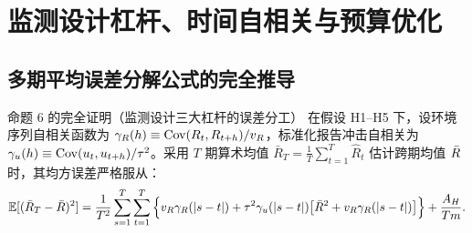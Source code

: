 \section{监测设计杠杆、时间自相关与预算优化}
\label{sec:part09}

\subsection{多期平均误差分解公式的完全推导}

\begin{theorembox}{命题 6 的完全证明（监测设计三大杠杆的误差分工）}
在假设 H1--H5 下，设环境序列自相关函数为 $\gamma_R(h) \equiv \mathrm{Cov}(R_t, R_{t+h})/v_R$，标准化报告冲击自相关为 $\gamma_u(h) \equiv \mathrm{Cov}(u_t, u_{t+h})/\tau^2$。采用 $T$ 期算术均值 $\bar{R}_T = \frac{1}{T}\sum_{t=1}^T \widehat{R}_t$ 估计跨期均值 $\bar{R}$ 时，其均方误差严格服从：
\begin{equation}
  \mathbb{E}[(\bar{R}_T - \bar{R})^2] = \frac{1}{T^2}\sum_{s=1}^T \sum_{t=1}^T \Big\{ v_R \gamma_R(|s-t|) + \tau^2 \gamma_u(|s-t|)\big[\bar{R}^2 + v_R \gamma_R(|s-t|)\big] \Big\} + \frac{A_H}{Tm}.
  \label{eq:alloc-decomp-general}
\end{equation}
\end{theorembox}

